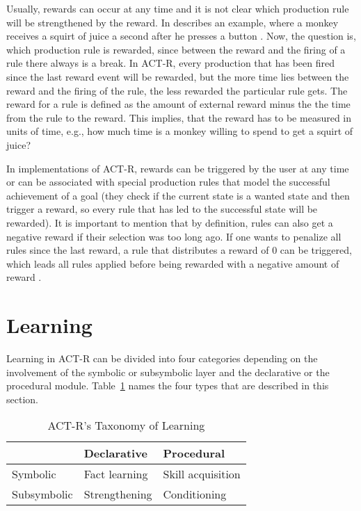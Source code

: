 Usually, rewards can occur at any time and it is not clear which production rule will be strengthened by the reward. In  \citeauthor{anderson_how_2007} describes an example, where a monkey receives a squirt of juice a second after he presses a button \cite[161]{anderson_how_2007}. Now, the question is, which production rule is rewarded, since between the reward and the firing of a rule there always is a break. In ACT-R, every production that has been fired since the last reward event will be rewarded, but the more time lies between the reward and the firing of the rule, the less rewarded the particular rule gets. The reward for a rule is defined as the amount of external reward minus the the time from the rule to the reward. This implies, that the reward has to be measured in units of time, e.g., how much time is a monkey willing to spend to get a squirt of juice? \cite[161]{anderson_how_2007}

In implementations of ACT-R, rewards can be triggered by the user at any time or can be associated with special production rules that model the successful achievement of a goal (they check if the current state is a wanted state and then trigger a reward, so every rule that has led to the successful state will be rewarded). It is important to mention that by definition, rules can also get a negative reward if their selection was too long ago. If one wants to penalize all rules since the last reward, a rule that distributes a reward of 0 can be triggered, which leads all rules applied before being rewarded with a negative amount of reward \cite[unit 6, p. 8]{actr_tutorial}.

\section{Learning}

Learning in ACT-R can be divided into four categories depending on the involvement of the symbolic or subsymbolic layer and the declarative or the procedural module. Table~\ref{tab:learning_types} names the four types that are described in this section.

\begin{table}[hbt]
\caption{ACT-R's Taxonomy of Learning \cite[92--95]{anderson_how_2007}}
\label{tab:learning_types}
\begin{center}
\begin{tabular}{|l|ll|}
\hline
 & Declarative & Procedural\\
\hline
Symbolic & Fact learning & Skill acquisition\\
Subsymbolic & Strengthening & Conditioning\\
\hline
\end{tabular}
\end{center}
\end{table}


